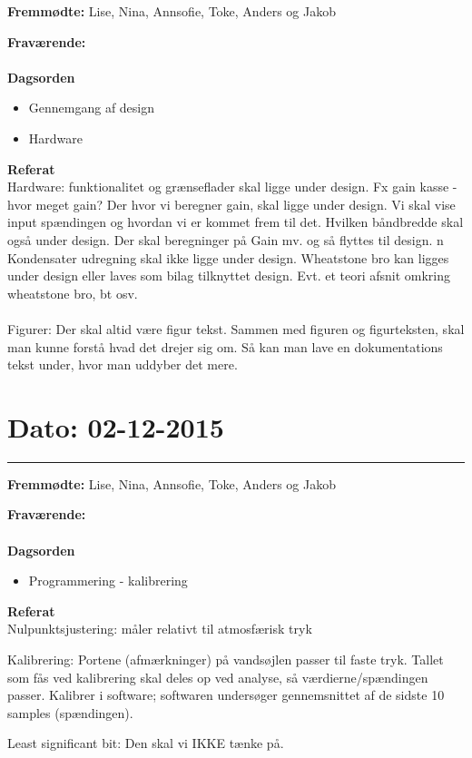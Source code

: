 \textbf{Fremmødte:} Lise, Nina, Annsofie, Toke, Anders og Jakob

\textbf{Fraværende:} 
\\
\\
\textbf{Dagsorden}
\begin{itemize}
	\item Gennemgang af design
	\item Hardware
\end{itemize}

\textbf{Referat}
\\
Hardware: funktionalitet og grænseflader skal ligge under design. Fx gain kasse - hvor meget gain? Der hvor vi beregner gain, skal ligge under design. Vi skal vise input spændingen og hvordan vi er kommet frem til det. Hvilken båndbredde skal også under design. Der skal beregninger på Gain mv. og så flyttes til design. n
Kondensater udregning skal ikke ligge under design.
Wheatstone bro kan ligges under design eller laves som bilag tilknyttet design. 
Evt. et teori afsnit omkring wheatstone bro, bt osv.
\\
\\
Figurer: Der skal altid være figur tekst. Sammen med figuren og figurteksten, skal man kunne forstå hvad det drejer sig om. Så kan man lave en dokumentations tekst under, hvor man uddyber det mere. 



\section{Dato: 02-12-2015}
\hrule

\textbf{Fremmødte:} Lise, Nina, Annsofie, Toke, Anders og Jakob

\textbf{Fraværende:} 
\\
\\
\textbf{Dagsorden}
\begin{itemize}
	\item Programmering - kalibrering
\end{itemize}

\textbf{Referat}
\\
Nulpunktsjustering: måler relativt til atmosfærisk tryk

Kalibrering: Portene (afmærkninger) på vandsøjlen passer til faste tryk. Tallet som fås ved kalibrering skal deles op ved analyse, så værdierne/spændingen passer. 
Kalibrer i software; softwaren undersøger gennemsnittet af de sidste 10 samples (spændingen). 

Least significant bit: Den skal vi IKKE tænke på.

